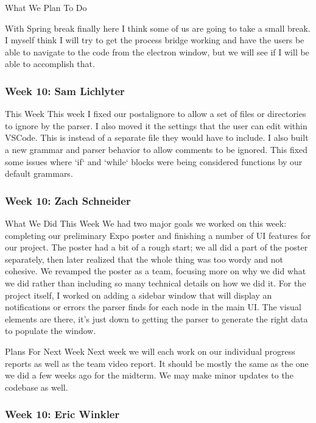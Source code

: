 What We Plan To Do

With Spring break finally here I think some of us are going to take a small break. I myself think I will try to get the process bridge working and have the users be able to navigate to the code from the electron window, but we will see if I will be able to accomplish that.

\subsubsection{Week 10: Sam Lichlyter}

This Week
This week I fixed our postalignore to allow a set of files or directories to ignore by the parser. I also moved it the settings that the user can edit within VSCode. This is instead of a separate file they would have to include. I also built a new grammar and parser behavior to allow comments to be ignored. This fixed some issues where `if` and `while` blocks were being considered functions by our default grammars.

\subsubsection{Week 10: Zach Schneider}

What We Did This Week
We had two major goals we worked on this week: completing our preliminary Expo poster and finishing a number of UI features for our project. The poster had a bit of a rough start; we all did a part of the poster separately, then later realized that the whole thing was too wordy and not cohesive. We revamped the poster as a team, focusing more on why we did what we did rather than including so many technical details on how we did it. For the project itself, I worked on adding a sidebar window that will display an notifications or errors the parser finds for each node in the main UI. The visual elements are there, it's just down to getting the parser to generate the right data to populate the window.

Plans For Next Week
Next week we will each work on our individual progress reports as well as the team video report. It should be mostly the same as the one we did a few weeks ago for the midterm. We may make minor updates to the codebase as well.

\subsubsection{Week 10: Eric Winkler}

